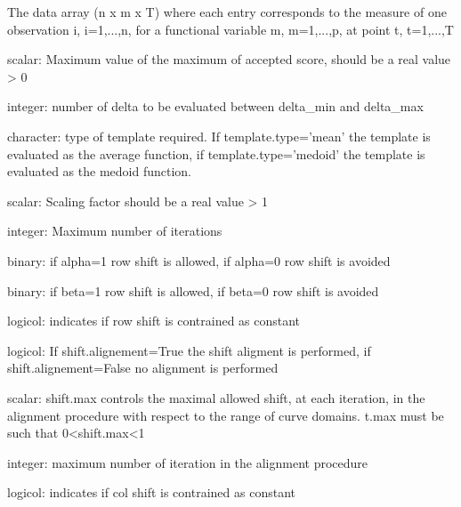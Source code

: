 \documentclass[a4paper]{book}
\begin{document}
\begin{Arguments}
\begin{ldescription}
\item[\code{fun\_mat}] The data array (n x m x T) where each entry corresponds to the measure of one observation i, i=1,...,n, for a functional variable m, m=1,...,p, at point t, t=1,...,T

\item[\code{delta\_min}] scalar: Maximum value of the maximum of accepted score, should be a real value > 0

\item[\code{num\_delta}] integer: number of delta to be evaluated between delta\_min and delta\_max

\item[\code{template.type}] character: type of template required. If template.type='mean' the template is evaluated as the average function, if template.type='medoid' the template is evaluated as the medoid function.

\item[\code{theta}] scalar: Scaling factor should be a real value > 1

\item[\code{number}] integer: Maximum number of iterations

\item[\code{alpha}] binary: if alpha=1 row shift is allowed, if alpha=0 row shift is avoided

\item[\code{beta}] binary: if beta=1 row shift is allowed, if beta=0 row shift is avoided

\item[\code{const\_alpha}] logicol: indicates if row shift is contrained as constant

\item[\code{shift.alignement}] logicol: If shift.alignement=True the shift aligment is performed, if shift.alignement=False no alignment is performed

\item[\code{shift.max}] scalar: shift.max controls the maximal allowed shift, at each iteration, in the alignment procedure with respect to the range of curve domains. t.max must be such that 0<shift.max<1

\item[\code{max.iter.align}] integer: maximum number of iteration in the alignment procedure

\item[\code{const\_b}] logicol: indicates if col shift is contrained as constant
\end{ldescription}
\end{Arguments}
\end{document}
